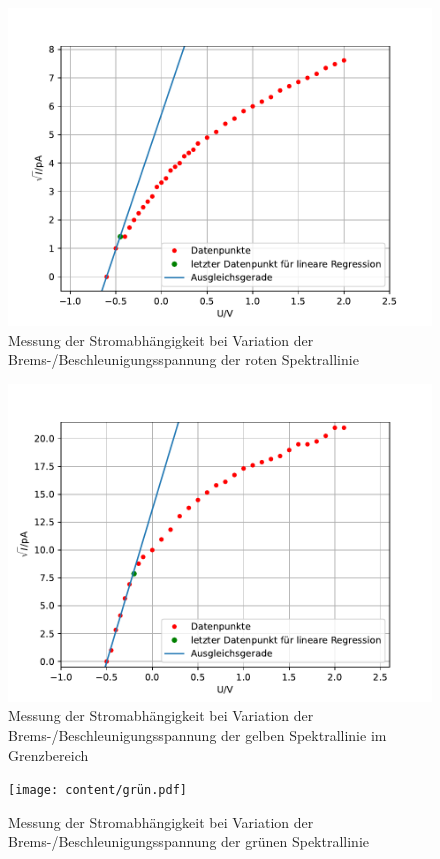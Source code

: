 \begin{figure}[H]
  \centering
  \includegraphics{content/rot.pdf}
  \caption{Messung der Stromabhängigkeit bei Variation der Brems-/Beschleunigungsspannung der roten Spektrallinie}
  \label{fig:rot}
\end{figure}
\begin{figure}[H]
  \centering
  \includegraphics{content/gelb.pdf}
  \caption{Messung der Stromabhängigkeit bei Variation der Brems-/Beschleunigungsspannung der gelben Spektrallinie im Grenzbereich}
  \label{fig:gelb}
\end{figure}
\begin{figure}[H]
  \centering
  \texttt{[image: content/grün.pdf]}
  \caption{Messung der Stromabhängigkeit bei Variation der Brems-/Beschleunigungsspannung der grünen Spektrallinie}
  \label{fig:grün}
\end{figure}
